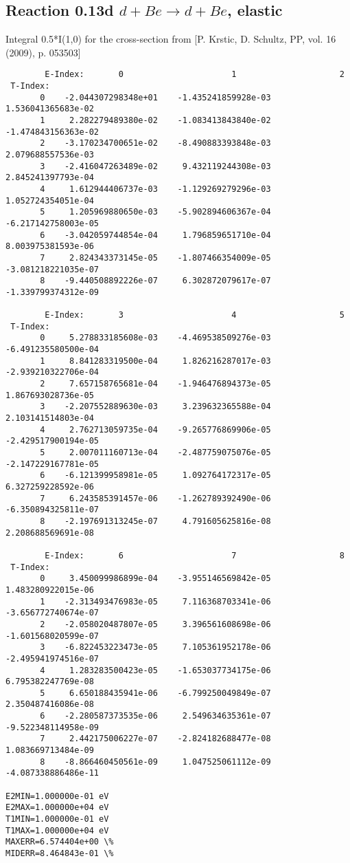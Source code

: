\documentclass[12pt,dvipdfmx]{article}
\begin{document}
\subsection{
Reaction 0.13d  $d + Be \rightarrow d + Be$, elastic}

Integral 0.5*I(1,0) for the cross-section from [P. Krstic, D. Schultz, PP, vol. 16 (2009), p. 053503]

\begin{small}\begin{verbatim}
        E-Index:       0                      1                     2
 T-Index:
       0    -2.044307298348e+01    -1.435241859928e-03     1.536041365683e-02
       1     2.282279489380e-02    -1.083413843840e-02    -1.474843156363e-02
       2    -3.170234700651e-02    -8.490883393848e-03     2.079688557536e-03
       3    -2.416047263489e-02     9.432119244308e-03     2.845241397793e-04
       4     1.612944406737e-03    -1.129269279296e-03     1.052724354051e-04
       5     1.205969880650e-03    -5.902894606367e-04    -6.217142758003e-05
       6    -3.042059744854e-04     1.796859651710e-04     8.003975381593e-06
       7     2.824343373145e-05    -1.807466354009e-05    -3.081218221035e-07
       8    -9.440508892226e-07     6.302872079617e-07    -1.339799374312e-09

        E-Index:       3                      4                     5
 T-Index:
       0     5.278833185608e-03    -4.469538509276e-03    -6.491235580500e-04
       1     8.841283319500e-04     1.826216287017e-03    -2.939210322706e-04
       2     7.657158765681e-04    -1.946476894373e-05     1.867693028736e-05
       3    -2.207552889630e-03     3.239632365588e-04     2.103141514803e-04
       4     2.762713059735e-04    -9.265776869906e-05    -2.429517900194e-05
       5     2.007011160713e-04    -2.487759075076e-05    -2.147229167781e-05
       6    -6.121399958981e-05     1.092764172317e-05     6.327259228592e-06
       7     6.243585391457e-06    -1.262789392490e-06    -6.350894325811e-07
       8    -2.197691313245e-07     4.791605625816e-08     2.208688569691e-08

        E-Index:       6                      7                     8
 T-Index:
       0     3.450099986899e-04    -3.955146569842e-05     1.483280922015e-06
       1    -2.313493476983e-05     7.116368703341e-06    -3.656772740674e-07
       2    -2.058020487807e-05     3.396561608698e-06    -1.601568020599e-07
       3    -6.822453223473e-05     7.105361952178e-06    -2.495941974516e-07
       4     1.283283500423e-05    -1.653037734175e-06     6.795382247769e-08
       5     6.650188435941e-06    -6.799250049849e-07     2.350487416086e-08
       6    -2.280587373535e-06     2.549634635361e-07    -9.522348114958e-09
       7     2.442175006227e-07    -2.824182688477e-08     1.083669713484e-09
       8    -8.866460450561e-09     1.047525061112e-09    -4.087338886486e-11

E2MIN=1.000000e-01 eV
E2MAX=1.000000e+04 eV
T1MIN=1.000000e-01 eV
T1MAX=1.000000e+04 eV
MAXERR=6.574404e+00 \%
MIDERR=8.464843e-01 \%
\end{verbatim}\end{small}
\newpage
\end{document}
